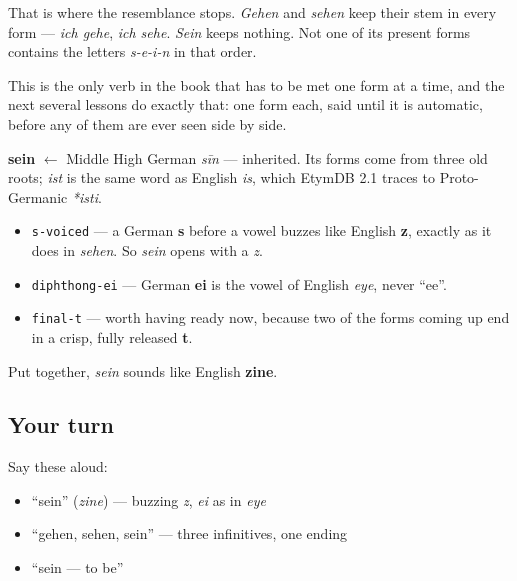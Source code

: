 That is where the resemblance stops. \emph{Gehen} and \emph{sehen} keep their stem in every form — \emph{ich gehe}, \emph{ich sehe}. \emph{Sein} keeps nothing. Not one of its present forms contains the letters \emph{s-e-i-n} in that order.

This is the only verb in the book that has to be met one form at a time, and the next several lessons do exactly that: one form each, said until it is automatic, before any of them are ever seen side by side.

\begin{cousinweb}
\textbf{sein} $\leftarrow$ Middle High German \emph{sīn} — inherited. Its forms come from three old roots; \emph{ist} is the same word as English \emph{is}, which EtymDB 2.1 traces to Proto-Germanic \emph{*isti}.
\end{cousinweb}

\begin{sounds}
\begin{itemize}
\raggedright
  \item \texttt{s-voiced} — a German \textbf{s} before a vowel buzzes like English \textbf{z}, exactly as it does in \emph{sehen}. So \emph{sein} opens with a \emph{z}.
  \item \texttt{diphthong-ei} — German \textbf{ei} is the vowel of English \emph{eye}, never \textquotedblleft{}ee\textquotedblright{}.
  \item \texttt{final-t} — worth having ready now, because two of the forms coming up end in a crisp, fully released \textbf{t}.
\end{itemize}

Put together, \emph{sein} sounds like English \textbf{zine}.
\end{sounds}

\subsection*{Your turn}
Say these aloud:

\begin{itemize}
\raggedright
  \item \textquotedblleft{}sein\textquotedblright{} (\emph{zine}) — buzzing \emph{z}, \emph{ei} as in \emph{eye}
  \item \textquotedblleft{}gehen, sehen, sein\textquotedblright{} — three infinitives, one ending
  \item \textquotedblleft{}sein — to be\textquotedblright{}
\end{itemize}

